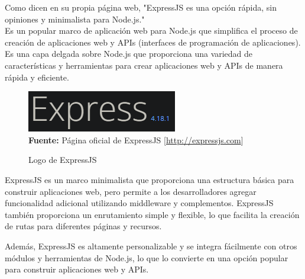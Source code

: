 Como dicen en su propia página web, "ExpressJS es una opción rápida, sin
opiniones y minimalista para Node.js."\\ Es un popular marco de aplicación web
para Node.js que simplifica el proceso de creación de aplicaciones web y APIs
(interfaces de programación de aplicaciones). Es una capa delgada sobre Node.js
que proporciona una variedad de características y herramientas para crear
aplicaciones web y APIs de manera rápida y eficiente.
\begin{figure}[htb!]
    \centering
    \caption{Logo de ExpressJS}
    \label{fig:express-logo}
    \centering
    \includegraphics[scale=0.5]{./Ilustraciones/logos/ExpressJS.png}\\
    \textbf{Fuente:} Página oficial de ExpressJS [\url{http://expressjs.com}]
\end{figure}
\hfill \break

ExpressJS es un marco minimalista que proporciona una estructura básica para
construir aplicaciones web, pero permite a los desarrolladores agregar
funcionalidad adicional utilizando middleware y complementos. ExpressJS también
proporciona un enrutamiento simple y flexible, lo que facilita la creación de
rutas para diferentes páginas y recursos.

Además, ExpressJS es altamente personalizable y se integra fácilmente con otros
módulos y herramientas de Node.js, lo que lo convierte en una opción popular
para construir aplicaciones web y APIs.
